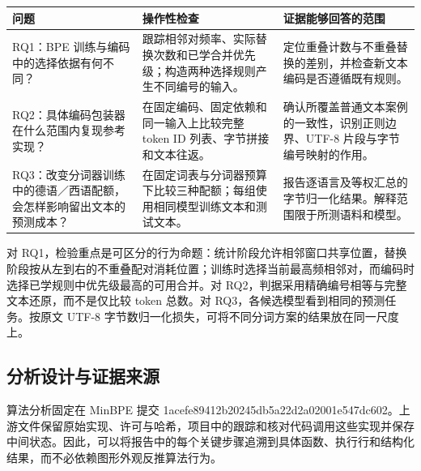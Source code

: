 \documentclass[11pt,a4paper]{article}
\newlength{\BpeDocTableWidth}
\newcommand{\BpeDocCodeInline}[1]{{\ttfamily #1}}
\newcommand{\BpeDocSubsection}[2]{\subsection{\texorpdfstring{#1}{#2}}}
\begin{document}
\begingroup\fontsize{9.3}{12.7}\selectfont{}
\setlength{\BpeDocTableWidth}{\dimexpr\linewidth-6\tabcolsep\relax}
\renewcommand{\arraystretch}{1.15}
\par\addvspace{0.45em}
\noindent\begin{minipage}{\linewidth}
\begin{tabular}{>{\raggedright\arraybackslash}p{0.280000\BpeDocTableWidth}>{\raggedright\arraybackslash}p{0.380000\BpeDocTableWidth}>{\raggedright\arraybackslash}p{0.340000\BpeDocTableWidth}}
\toprule
\textbf{问题} & \textbf{操作性检查} & \textbf{证据能够回答的范围} \\

\midrule
RQ1：BPE 训练与编码中的选择依据有何不同？ & 跟踪相邻对频率、实际替换次数和已学合并优先级；构造两种选择规则产生不同编号的输入。 & 定位重叠计数与不重叠替换的差别，并检查新文本编码是否遵循既有规则。 \\[3pt]
RQ2：具体编码包装器在什么范围内复现参考实现？ & 在固定编码、固定依赖和同一输入上比较完整 \BpeDocCodeInline{token} ID 列表、字节拼接和文本往返。 & 确认所覆盖普通文本案例的一致性，识别正则边界、UTF-8 片段与字节编号映射的作用。 \\[3pt]
RQ3：改变分词器训练中的德语／西语配额，会怎样影响留出文本的预测成本？ & 在固定词表与分词器预算下比较三种配额；每组使用相同模型训练文本和测试文本。 & 报告逐语言及等权汇总的字节归一化结果。解释范围限于所测语料和模型。 \\[3pt]
\bottomrule
\end{tabular}
\end{minipage}\par\addvspace{0.65em}
\endgroup


对 RQ1，检验重点是可区分的行为命题：统计阶段允许相邻窗口共享位置，替换阶段按从左到右的不重叠配对消耗位置；训练时选择当前最高频相邻对，而编码时选择已学规则中优先级最高的可用合并。对 RQ2，判据采用精确编号相等与完整文本还原，而不是仅比较 \BpeDocCodeInline{token} 总数。对 RQ3，各候选模型看到相同的预测任务。按原文 UTF-8 字节数归一化损失，可将不同分词方案的结果放在同一尺度上。


\BpeDocSubsection{分析设计与证据来源}{分析设计与证据来源}


算法分析固定在 MinBPE 提交 \BpeDocCodeInline{1acefe89\allowbreak{}412b2024\allowbreak{}5db5a22d\allowbreak{}2a02001e\allowbreak{}547dc602}。上游文件保留原始实现、许可与哈希，项目中的跟踪和核对代码调用这些实现并保存中间状态。因此，可以将报告中的每个关键步骤追溯到具体函数、执行行和结构化结果，而不必依赖图形外观反推算法行为。
\end{document}
